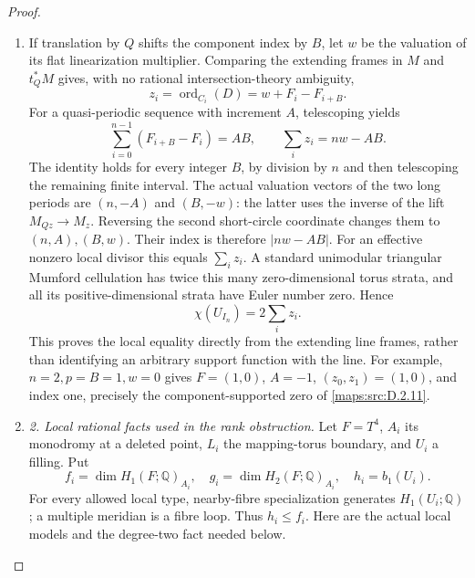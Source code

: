 \begin{proof}
\begin{enumerate}[label=\arabic*.,leftmargin=*]
\item If translation by $Q$ shifts the component index by $B$, let $w$ be
the valuation of its flat linearization multiplier. Comparing the
extending frames in $M$ and $t_Q^*M$ gives, with no rational
intersection-theory ambiguity,
\[
 z_i=\operatorname{ord}_{C_i}(D)=w+F_i-F_{i+B}.
\]
For a quasi-periodic sequence with increment $A$, telescoping yields
\[
 \sum_{i=0}^{n-1}(F_{i+B}-F_i)=AB,
 \qquad \sum_i z_i=nw-AB.                                    \tag{D.FI2}\label{maps:eq:D.FI2}
\]
The identity holds for every integer $B$, by division by $n$ and
then telescoping the remaining finite interval. The actual valuation
vectors of the two long periods are $(n,-A)$ and $(B,-w)$: the latter
uses the inverse of the lift $M_{Qz}\to M_z$. Reversing the second
short-circle coordinate changes them to $(n,A),(B,w)$. Their index
is therefore $|nw-AB|$. For an effective nonzero local divisor this
equals $\sum_i z_i$. A standard unimodular triangular Mumford
cellulation has twice this many zero-dimensional torus strata, and
all its positive-dimensional strata have Euler number zero. Hence
\[
                  \chi(U_{I_n})=2\sum_i z_i.                  \tag{D.FI3}\label{maps:eq:D.FI3}
\]
This proves the local equality directly from the extending line
frames, rather than identifying an arbitrary support function with
the line. For example, $n=2,p=B=1,w=0$ gives
$F=(1,0)$, $A=-1$, $(z_0,z_1)=(1,0)$, and index one, precisely
the component-supported zero of \ref{maps:src:D.2.11}.

\item \emph{2. Local rational facts used in the rank obstruction.}
Let $F=T^4$, $A_i$ its monodromy at a deleted point, $L_i$ the
mapping-torus boundary, and $U_i$ a filling. Put
\[
 f_i=\dim H_1(F;\mathbb Q)_{A_i},\quad
 g_i=\dim H_2(F;\mathbb Q)_{A_i},\quad h_i=b_1(U_i).
\]
For every allowed local type, nearby-fibre specialization generates
$H_1(U_i;\mathbb Q)$; a multiple meridian is a fibre loop. Thus
$h_i\le f_i$. Here are the actual local models and the degree-two
fact needed below.


\end{enumerate}
\end{proof}
